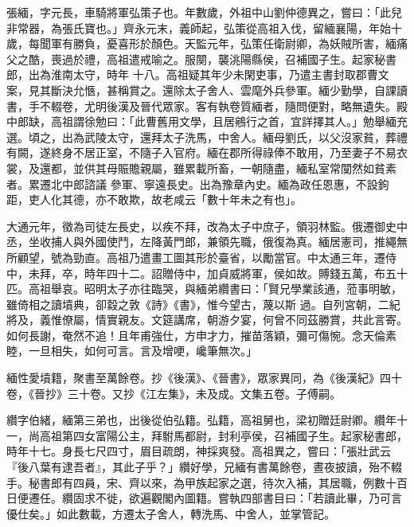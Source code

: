 
\begin{pinyinscope}

 張緬，字元長，車騎將軍弘策子也。年數歲，外祖中山劉仲德異之，嘗曰：「此兒非常器，為張氏寶也。」齊永元末，義師起，弘策從高祖入伐，留緬襄陽，年始十歲，每聞軍有勝負，憂喜形於顏色。天監元年，弘策任衛尉卿，為妖賊所害，緬痛父之酷，喪過於禮，高祖遣戒喻之。服闋，襲洮陽縣侯，召補國子生。起家秘書郎，出為淮南太守，時年
 十八。高祖疑其年少未閑吏事，乃遣主書封取郡曹文案，見其斷決允愜，甚稱賞之。還除太子舍人、雲麾外兵參軍。緬少勤學，自課讀書，手不輟卷，尤明後漢及晉代眾家。客有執卷質緬者，隨問便對，略無遺失。殿中郎缺，高祖謂徐勉曰：「此曹舊用文學，且居鵷行之首，宜詳擇其人。」勉舉緬充選。頃之，出為武陵太守，還拜太子洗馬，中舍人。緬母劉氏，以父沒家貧，葬禮有闕，遂終身不居正室，不隨子入官府。緬在郡所得祿俸不敢用，乃至妻子不易衣裳，及還都，並供其母賑贍親屬，雖累載所畜，一朝隨盡，緬私室常闃然如貧素者。累遷北中郎諮議
 參軍、寧遠長史。出為豫章內史。緬為政任恩惠，不設鉤距，吏人化其德，亦不敢欺，故老咸云「數十年未之有也」。



 大通元年，徵為司徒左長史，以疾不拜，改為太子中庶子，領羽林監。俄遷御史中丞，坐收捕人與外國使鬥，左降黃門郎，兼領先職，俄復為真。緬居憲司，推繩無所顧望，號為勁直。高祖乃遣畫工圖其形於臺省，以勵當官。中太通三年，遷侍中，未拜，卒，時年四十二。詔贈侍中，加貞威將軍，侯如故。賻錢五萬，布五十匹。高祖舉哀。昭明太子亦往臨哭，與緬弟纘書曰：「賢兄學業該通，蒞事明敏，雖倚相之讀墳典，卻縠之敦《詩》《書》，惟今望古，蔑以斯
 過。自列宮朝，二紀將及，義惟僚屬，情實親友。文筵講席，朝游夕宴，何曾不同茲勝賞，共此言寄。如何長謝，奄然不追！且年甫強仕，方申才力，摧苗落穎，彌可傷惋。念天倫素睦，一旦相失，如何可言。言及增哽，巉筆無次。」



 緬性愛墳籍，聚書至萬餘卷。抄《後漢》、《晉書》，眾家異同，為《後漢紀》四十卷，《晉抄》三十卷。又抄《江左集》，未及成。文集五卷。子傅嗣。



 纘字伯緒，緬第三弟也，出後從伯弘籍。弘籍，高祖舅也，梁初贈廷尉卿。纘年十一，尚高祖第四女富陽公主，拜駙馬都尉，封利亭侯，召補國子生。起家秘書郎，時年十七。身長七尺四寸，眉目疏朗，神採爽發。高祖異之，嘗曰：「張壯武云『後八葉有逮吾者』，其此子乎？」纘好學，兄緬有書萬餘卷，晝夜披讀，殆不輟手。秘書郎有四員，宋、齊以來，為甲族起家之選，待次入補，其居職，例數十百
 日便遷任。纘固求不徙，欲遍觀閣內圖籍。嘗執四部書目曰：「若讀此畢，乃可言優仕矣。」如此數載，方遷太子舍人，轉洗馬、中舍人，並掌管記。




\end{pinyinscope}
